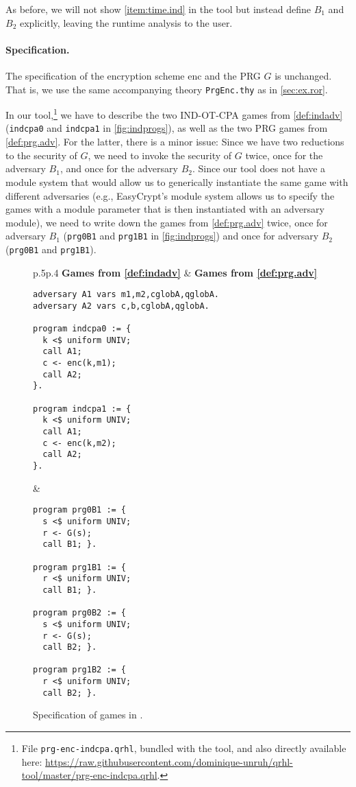 \documentclass{article}
\newcommand\giturl[1]{\url{https://raw.githubusercontent.com/dominique-unruh/qrhl-tool/master/#1}}
\begin{document}
As before, we will not show \eqref{item:time.ind} in the tool but
instead define $B_1$
and $B_2$ explicitly, leaving the runtime analysis to the user.

\paragraph{Specification.} The specification of the encryption scheme
$\mathrm{enc}$
and the PRG $G$
is unchanged. That is, we use the same accompanying theory
\texttt{PrgEnc.thy} as in \autoref{sec:ex.ror}.

In our tool,\footnote{File \texttt{prg-enc-indcpa.qrhl}, bundled with
  the tool, and also directly available here: \giturl{prg-enc-indcpa.qrhl}.} we have
to describe the two IND-OT-CPA games from \autoref{def:indadv}
(\texttt{indcpa0} and \texttt{indcpa1} in \autoref{fig:indprogs}), as well as the
two PRG games from \autoref{def:prg.adv}. For the latter, there is a
minor issue: Since we have two reductions to the security of $G$,
we need to invoke the security of $G$
twice, once for the adversary $B_1$,
and once for the adversary $B_2$.
Since our tool does not have a module system that would allow us to
generically instantiate the same game with different adversaries
(e.g., EasyCrypt's module system allows us to specify the games with a
module parameter that is then instantiated with an adversary module),
we need to write down the games from \autoref{def:prg.adv} twice, once
for adversary $B_1$
(\texttt{prg0B1} and \texttt{prg1B1} in \autoref{fig:indprogs}) and once for
adversary $B_2$ (\texttt{prg0B1} and \texttt{prg1B1}).

\begin{figure}[t]\centering
  \lstset{aboveskip=0pt,belowskip=0pt,frame=single}
  \centering
  \begin{tabular}{p{.5\hsize}p{.4\hsize}}
    \textbf{Games from \autoref{def:indadv}}
    &
    \textbf{Games from \autoref{def:prg.adv}}
    \\[-5pt]
    \begin{lstlisting}
adversary A1 vars m1,m2,cglobA,qglobA.
adversary A2 vars c,b,cglobA,qglobA.

program indcpa0 := {
  k <$ uniform UNIV;
  call A1;
  c <- enc(k,m1);
  call A2;
}.

program indcpa1 := {
  k <$ uniform UNIV;
  call A1;
  c <- enc(k,m2);
  call A2;
}.
\end{lstlisting}
    &
      \begin{lstlisting}
program prg0B1 := {
  s <$ uniform UNIV;
  r <- G(s);
  call B1; }.

program prg1B1 := {
  r <$ uniform UNIV;
  call B1; }.

program prg0B2 := {
  s <$ uniform UNIV;
  r <- G(s);
  call B2; }.

program prg1B2 := {
  r <$ uniform UNIV;
  call B2; }.
\end{lstlisting}
  \end{tabular}
  \vspace*{-5mm}
  \caption{Specification of games in .}
  \label{fig:indprogs}
\end{figure}
\end{document}
